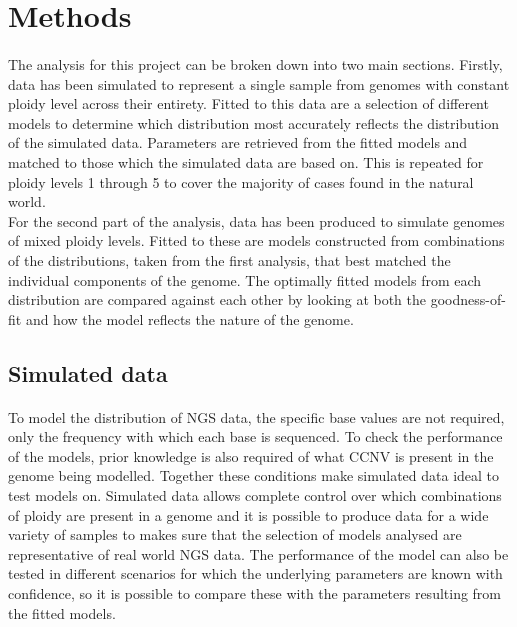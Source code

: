 \documentclass[11pt]{article}
\begin{document}
\section{Methods} 
\paragraph{}The analysis for this project can be broken down into two main sections. Firstly, data has been simulated to represent a single sample from genomes with constant ploidy level across their entirety. Fitted to this data are a selection of different models to determine which distribution most accurately reflects the distribution of the simulated data. Parameters are retrieved from the fitted models and matched to those which the simulated data are based on. This is repeated for ploidy levels 1 through 5 to cover the majority of cases found in the natural world. 
\\
For the second part of the analysis, data has been produced to simulate genomes of mixed ploidy levels. Fitted to these are models constructed from combinations of the distributions, taken from the first analysis, that best matched the individual components of the genome. The optimally fitted models from each distribution are compared against each other by looking at both the goodness-of-fit and how the model reflects the nature of the genome.
\subsection{Simulated data}
\paragraph{}To model the distribution of NGS data, the specific base values are not required, only the frequency with which each base is sequenced. To check the performance of the models, prior knowledge is also required of what CCNV is present in the genome being modelled. Together these conditions make simulated data ideal to test models on. Simulated data allows complete control over which combinations of ploidy are present in a genome and it is possible to produce data for a wide variety of samples to makes sure that the selection of models analysed are representative of real world NGS data. The performance of the model can also be tested in different scenarios for which  the underlying parameters are known with confidence, so it is possible to compare these with the parameters resulting from the fitted models.
\end{document}
